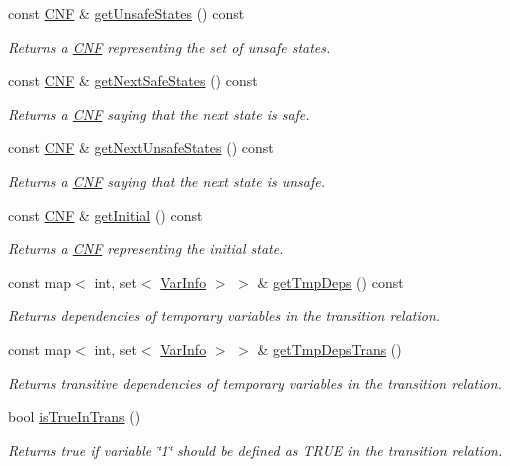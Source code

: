 \begin{DoxyCompactItemize}
const \hyperlink{classCNF}{C\-N\-F} \& \hyperlink{classAIG2CNF_a7e6e6af6ac83605669918008b12d30e7}{get\-Unsafe\-States} () const 
\begin{DoxyCompactList}\small\item\em Returns a \hyperlink{classCNF}{C\-N\-F} representing the set of unsafe states. \end{DoxyCompactList}\item 
const \hyperlink{classCNF}{C\-N\-F} \& \hyperlink{classAIG2CNF_af04a7275b64d96d7c16c5c8c8668b93c}{get\-Next\-Safe\-States} () const 
\begin{DoxyCompactList}\small\item\em Returns a \hyperlink{classCNF}{C\-N\-F} saying that the next state is safe. \end{DoxyCompactList}\item 
const \hyperlink{classCNF}{C\-N\-F} \& \hyperlink{classAIG2CNF_a1bec5428f2f5f6efa41810a308ebbe1f}{get\-Next\-Unsafe\-States} () const 
\begin{DoxyCompactList}\small\item\em Returns a \hyperlink{classCNF}{C\-N\-F} saying that the next state is unsafe. \end{DoxyCompactList}\item 
const \hyperlink{classCNF}{C\-N\-F} \& \hyperlink{classAIG2CNF_ae20be327c24ca3ed7493b56a254d6a63}{get\-Initial} () const 
\begin{DoxyCompactList}\small\item\em Returns a \hyperlink{classCNF}{C\-N\-F} representing the initial state. \end{DoxyCompactList}\item 
const map$<$ int, set$<$ \hyperlink{classVarInfo}{Var\-Info} $>$ $>$ \& \hyperlink{classAIG2CNF_a3f4076dda7514fc3015867494be3aaac}{get\-Tmp\-Deps} () const 
\begin{DoxyCompactList}\small\item\em Returns dependencies of temporary variables in the transition relation. \end{DoxyCompactList}\item 
const map$<$ int, set$<$ \hyperlink{classVarInfo}{Var\-Info} $>$ $>$ \& \hyperlink{classAIG2CNF_a87d64a22868a17f6c3cf8dd3af88f02b}{get\-Tmp\-Deps\-Trans} ()
\begin{DoxyCompactList}\small\item\em Returns transitive dependencies of temporary variables in the transition relation. \end{DoxyCompactList}\item 
bool \hyperlink{classAIG2CNF_a3f4358961404803c1be6b73f5aada4ce}{is\-True\-In\-Trans} ()
\begin{DoxyCompactList}\small\item\em Returns true if variable \char`\"{}1\char`\"{} should be defined as T\-R\-U\-E in the transition relation. \end{DoxyCompactList}\end{DoxyCompactItemize}
